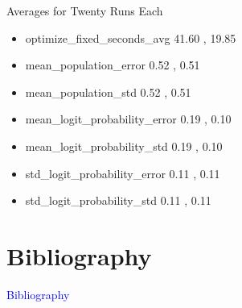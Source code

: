 \documentclass{beamer}
\newcommand{\Blue}[1]{\textcolor{blue}{#1}}
\newcommand{\Section}[1]{
	\section{#1}
	\begin{frame}
	\begin{center}
	\Blue{ \Large{#1} }
	\end{center}
	\end{frame}
}
\begin{document}
\begin{frame}{Averages for Twenty Runs Each}
\begin{itemize}

\item
optimize\_fixed\_seconds\_avg
\hspace{0.0em} 41.60 , 19.85
\pause

\item
mean\_population\_error
\hspace{2.35em} 0.52 , 0.51
\pause

\item
mean\_population\_std
\hspace{3.05em} 0.52 , 0.51
\pause

\item
mean\_logit\_probability\_error
\hspace{0.2em} 0.19 , 0.10
\pause

\item
mean\_logit\_probability\_std
\hspace{0.9em} 0.19 , 0.10
\pause

\item
std\_logit\_probability\_error
\hspace{1.2em} 0.11 , 0.11
\pause

\item
std\_logit\_probability\_std
\hspace{1.85em} 0.11 , 0.11
\pause


\end{itemize}
\end{frame}

\Section{Bibliography}
%
{}

\end{document}
